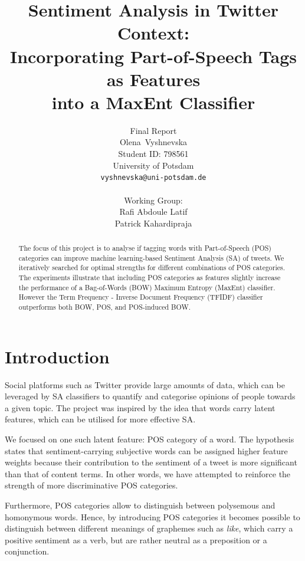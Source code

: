 \documentclass[titlepage]{article}
\title {
Sentiment Analysis in Twitter Context: \\Incorporating Part-of-Speech Tags as Features \\ into a MaxEnt Classifier}
\author{%
  Final Report \\
  Olena~Vyshnevska \\
  Student ID: 798561 \\
  University of Potsdam \\
  \texttt{vyshnevska@uni-potsdam.de} \\
  \textbf{} \\
  Working Group: \\
  Rafi Abdoule Latif \\
  Patrick Kahardipraja}
\begin{document}
\maketitle

\begin{abstract}
The focus of this project is to analyse if tagging words with Part-of-Speech (POS) categories can improve machine learning-based Sentiment Analysis (SA) of tweets. We iteratively searched for optimal strengths for different combinations of POS categories. The experiments illustrate that including POS categories as features slightly increase the performance of a Bag-of-Words (BOW) Maximum Entropy (MaxEnt) classifier. However the Term Frequency - Inverse Document Frequency (TFIDF) classifier outperforms both BOW, POS, and POS-induced BOW.
\end{abstract}

\newpage
\setcounter{page}{1}

\section{Introduction}

Social platforms such as Twitter provide large amounts of data, which can be leveraged by SA classifiers to quantify and categorise opinions of people towards a given topic. The project was inspired by the idea that words carry latent features, which can be utilised for more effective SA.

We focused on one such latent feature: POS category of a word. The hypothesis states that sentiment-carrying subjective words can be assigned higher feature weights because their contribution to the sentiment of a tweet is more significant than that of content terms. In other words, we have attempted to reinforce the strength of more discriminative POS categories. 

Furthermore, POS categories allow to distinguish between polysemous and homonymous words. Hence, by introducing POS categories it becomes possible to distinguish between different meanings of graphemes such as  \textit{like}, which carry a positive sentiment as a verb, but are rather neutral as a preposition or a conjunction. 
\end{document}
